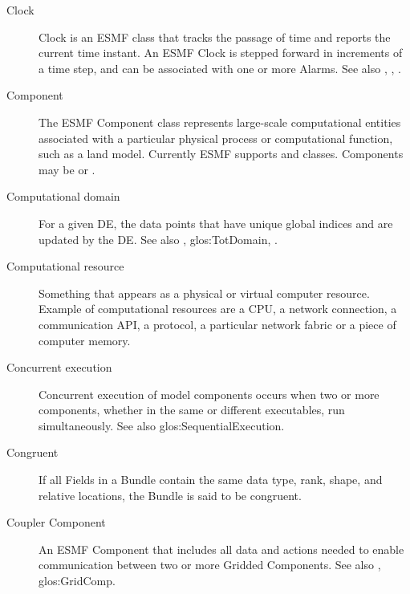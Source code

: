 \begin{description}
\label{glos:Clock}
\item[Clock] Clock is an ESMF class that tracks the passage of time and 
  reports the current time instant.  An ESMF Clock 
  is stepped forward in increments of a time step, and can be associated
  with one or more Alarms.
  See also , , .

\label{glos:Component}
\item[Component] The ESMF Component class represents large-scale
  computational entities associated with a particular physical
  process or computational function, such as a land model.  
  Currently ESMF supports 
  and  classes.
  Components may be  or 
  .  

\label{glos:CompDomain}
\item[Computational domain] For a given DE, the data points that 
  have unique global indices and are updated by the DE.  
  See also , 
  {glos:TotDomain}, .

\label{glos:CompResource}
\item[Computational resource] Something that appears as a
  physical or virtual computer resource. Example of computational resources
  are a CPU, a network connection, a communication API, a protocol, a 
  particular network fabric or a piece of computer memory. 

\label{glos:ConcurrentExecution}
\item[Concurrent execution] 
  Concurrent execution of model components occurs when two or more components,
  whether in the same or different executables, run simultaneously.
  See also 
  {glos:SequentialExecution}.

\label{glos:Congruent}
\item[Congruent] 
  If all Fields in a Bundle contain the same data type, rank, shape, and 
  relative locations, the Bundle is said to be congruent. 

\label{glos:Coupler}
\item[Coupler Component]
  An ESMF Component that includes all data and actions needed to enable 
  communication between two or more Gridded Components. 
  See also , 
  {glos:GridComp}. 


\end{description}
